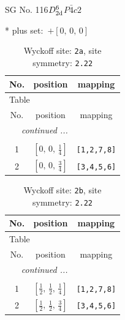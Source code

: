 \documentclass[fleqn,8pt]{jsarticle}
\begin{document}
\setcounter{MaxMatrixCols}{32}

\renewcommand{\tablename}{Table~}
\renewcommand{\figurename}{Figure~}
\begin{center}
\LARGE
SG No. 116\quad$D_{\rm 2d}^{6}$\quad$P\bar{4}c2$\quad[ tetragonal ]
\end{center}
* plus set:\,\,\,$+\left[ 0,\, 0,\, 0 \right]$
\renewcommand{\arraystretch}{1.2}
\begin{longtable}{ccc}
\caption{Wyckoff site: {\tt 2a}, site symmetry: {\tt 2.22}}
 \\
 \hline \hline
No. & position & mapping \\ \hline \endfirsthead

\multicolumn{2}{l}{\tablename\ \thetable{}} \\
 \hline \hline
No. & position & mapping \\ \hline \endhead

 \hline \hline
\multicolumn{2}{r}{\footnotesize\it continued ...} \\ \endfoot

 \hline \hline
\multicolumn{2}{r}{} \\ \endlastfoot

1 & $\left[ 0,\, 0,\, \frac{1}{4} \right]$ & {\tt [1,2,7,8]} \\ \hline
2 & $\left[ 0,\, 0,\, \frac{3}{4} \right]$ & {\tt [3,4,5,6]} \\
\end{longtable}
\renewcommand{\arraystretch}{1.2}
\begin{longtable}{ccc}
\caption{Wyckoff site: {\tt 2b}, site symmetry: {\tt 2.22}}
 \\
 \hline \hline
No. & position & mapping \\ \hline \endfirsthead

\multicolumn{2}{l}{\tablename\ \thetable{}} \\
 \hline \hline
No. & position & mapping \\ \hline \endhead

 \hline \hline
\multicolumn{2}{r}{\footnotesize\it continued ...} \\ \endfoot

 \hline \hline
\multicolumn{2}{r}{} \\ \endlastfoot

1 & $\left[ \frac{1}{2},\, \frac{1}{2},\, \frac{1}{4} \right]$ & {\tt [1,2,7,8]} \\ \hline
2 & $\left[ \frac{1}{2},\, \frac{1}{2},\, \frac{3}{4} \right]$ & {\tt [3,4,5,6]} \\
\end{longtable}
\end{document}
